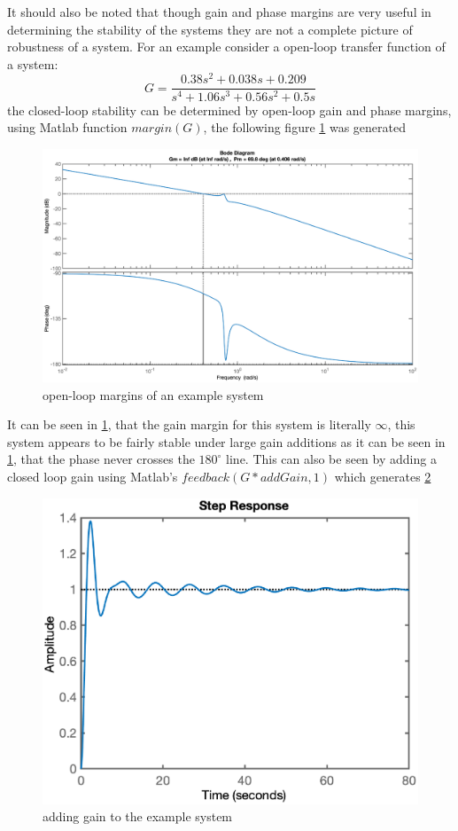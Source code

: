 It should also be noted that though gain and phase margins are very useful in determining the stability of the systems they are not a complete picture of robustness of a system. For an example consider a open-loop transfer function of  a system:
\begin{equation}
	G = \frac{0.38s^2 + 0.038 s + 0.209}{s^4 + 1.06 s^3 + 0.56 s^2 + 0.5s}
\end{equation}
the closed-loop stability can be determined by open-loop gain and phase margins, using Matlab function $margin(G)$, the following figure \ref{fig_2_ch_RC_intro_1} was generated
\begin{figure}[h!]
	\centering
	\includegraphics[width=1.2\linewidth]{Bilder/Matlab_RobustControl_Intro_1.eps}
	\caption{open-loop margins of an example system}
	\label{fig_2_ch_RC_intro_1}
\end{figure}
\newpage
It can be seen in \ref{fig_2_ch_RC_intro_1}, that the gain margin for this system is literally $\infty$, this system appears to be fairly stable under large gain additions as it can be seen in \ref{fig_2_ch_RC_intro_1}, that the phase never crosses the $180^{\circ}$ line. This can also be seen by adding a closed loop gain using Matlab's $feedback(G*addGain,1)$ which generates \ref{fig_2_ch_RC_intro_2}
\begin{figure}[h!]
	\raggedleft
	\includegraphics[width=0.75\linewidth]{Bilder/Matlab_RobustControl_Intro_2.eps}
	\caption{adding gain to the example system}
	\label{fig_2_ch_RC_intro_2}
\end{figure}
